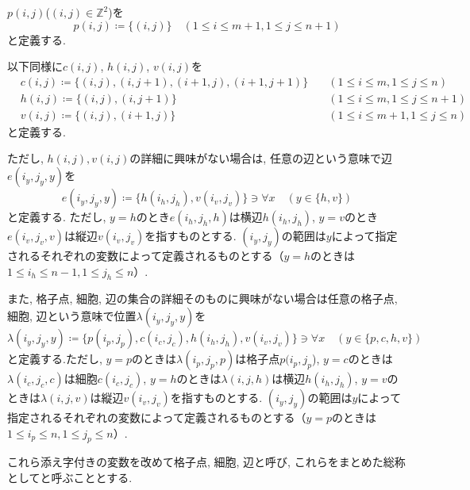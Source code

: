 \begin{definition}[格子点$p(i,j)$, 細胞$c(i,j)$, 横辺$h(i,j)$, 縦辺$v(i,j)$]\label{definition:VariableAtBoard}
  $p(i,j)$($(i,j)\in \mathbb{Z}^2$)を
  \begin{equation*}
    p(i,j)\coloneqq \{(i,j)\} \quad (1\leq i \leq m+1, 1\leq j \leq n+1)
  \end{equation*}
  と定義する.

  以下同様に$c(i,j)$, $h(i,j)$, $v(i,j)$を
  \begin{align*}
     & c(i,j)\coloneqq  \{(i,j), (i,j+1), (i+1,j), (i+1,j+1)\}  \quad & (1\leq i \leq m, 1\leq j \leq n)   \\
     & h(i,j)\coloneqq  \{(i,j), (i,j+1)\}                      \quad & (1\leq i \leq m, 1\leq j \leq n+1) \\
     & v(i,j)\coloneqq  \{(i,j), (i+1,j)\}                      \quad & (1\leq i \leq m+1, 1\leq j \leq n)
  \end{align*}
  と定義する.

  ただし, $h(i,j),v(i,j)$の詳細に興味がない場合は, 任意の辺という意味で辺$e(i_y,j_y,y)$を
  \begin{equation*}
    e(i_y,j_y,y) \coloneqq \{h(i_h,j_h), v(i_v,j_v)\}\ni \forall x \quad (y \in \{h,v\})
  \end{equation*}
  と定義する.
  ただし, $y=h$のとき$e(i_h,j_h,h)$は横辺$h(i_h,j_h)$, $y=v$のとき$e(i_v,j_v,v)$は縦辺$v(i_v,j_v)$を指すものとする. $(i_y,j_y)$の範囲は$y$によって指定されるそれぞれの変数によって定義されるものとする（$y=h$のときは$1\leq i_h \leq n-1,1\leq j_h \leq n$）.

  また, 格子点, 細胞, 辺の集合の詳細そのものに興味がない場合は任意の格子点, 細胞, 辺という意味で位置$\lambda(i_y,j_y,y)$を
  \begin{equation*}
    \lambda(i_y,j_y,y) \coloneqq \{p(i_p,j_p),c(i_c,j_c),h(i_h,j_h),v(i_v,j_v)\}\ni \forall x \quad (y \in \{p,c,h,v\})
  \end{equation*}
  と定義する.ただし, $y=p$のときは$\lambda(i_p,j_p,p)$は格子点$p(i_p,j_p$), $y=c$のときは$\lambda(i_c,j_c,c)$は細胞$c(i_c,j_c)$, $y=h$のときは$\lambda(i,j,h)$は横辺$h(i_h,j_h)$, $y=v$のときは$\lambda(i,j,v)$は縦辺$v(i_v,j_v)$を指すものとする. $(i_y,j_y)$の範囲は$y$によって指定されるそれぞれの変数によって定義されるものとする（$y=p$のときは$1\leq i_p \leq n,1\leq j_p \leq n$）.
\end{definition}
これら添え字付きの変数を改めて格子点, 細胞, 辺と呼び, これらをまとめた総称としてと呼ぶこととする.



